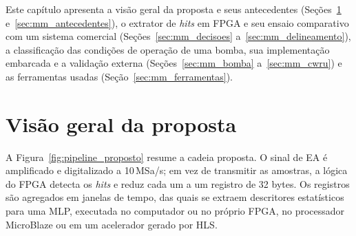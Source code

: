
Este capítulo apresenta a visão geral da proposta e seus antecedentes (Seções~\ref{sec:mm_visao} e~\ref{sec:mm_antecedentes}), o extrator de \textit{hits} em FPGA e seu ensaio comparativo com um sistema comercial (Seções~\ref{sec:mm_decisoes} a~\ref{sec:mm_delineamento}), a classificação das condições de operação de uma bomba, sua implementação embarcada e a validação externa (Seções~\ref{sec:mm_bomba} a~\ref{sec:mm_cwru}) e as ferramentas usadas (Seção~\ref{sec:mm_ferramentas}).

\section{Visão geral da proposta}
\label{sec:mm_visao}

A Figura~\ref{fig:pipeline_proposto} resume a cadeia proposta. O sinal de EA é amplificado e digitalizado a 10\,MSa/s; em vez de transmitir as amostras, a lógica do FPGA detecta os \textit{hits} e reduz cada um a um registro de 32 bytes. Os registros são agregados em janelas de tempo, das quais se extraem descritores estatísticos para uma MLP, executada no computador ou no próprio FPGA, no processador MicroBlaze ou em um acelerador gerado por HLS.

